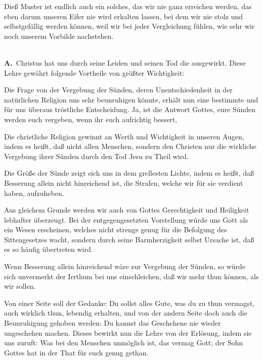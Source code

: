 \begin{aufza}
\begin{aufzb}
\item Dieß Muster ist endlich auch ein solches, das wir nie ganz erreichen werden, das eben darum unseren Eifer nie wird erkalten lassen, bei dem wir nie stolz und selbstgefällig werden können, weil wir bei jeder Vergleichung fühlen, wie sehr wir noch unserem Vorbilde nachstehen.
\end{aufzb}
\item \mbox{}\\
\textbf{A.}~Christus hat uns durch seine Leiden und seinen Tod die  ausgewirkt. Diese Lehre gewährt folgende Vortheile von größter Wichtigkeit:
\begin{aufzb}
\item Die Frage von der Vergebung der Sünden, deren Unentschiedenheit in der natürlichen Religion uns sehr beunruhigen könnte, erhält nun eine bestimmte und für uns überaus tröstliche Entscheidung. Ja, ist die Antwort Gottes, eure Sünden werden euch vergeben, wenn ihr euch aufrichtig bessert, \usw\
\item Die christliche Religion gewinnt an Werth und Wichtigkeit in unseren Augen, indem es heißt, daß nicht allen Menschen, sondern den Christen nur die wirkliche Vergebung ihrer Sünden durch den Tod Jesu zu Theil wird.~
\item Die Größe der Sünde zeigt sich uns in dem grellesten Lichte, indem es heißt, daß Besserung allein nicht hinreichend ist, die Strafen, welche wir für sie verdient haben, aufzuheben.
\item Aus gleichem Grunde werden wir auch von Gottes Gerechtigkeit und Heiligkeit lebhafter überzeugt. Bei der entgegengesetzten Vorstellung würde uns Gott als ein Wesen erscheinen, welches nicht strenge genug für die Befolgung des Sittengesetzes wacht, sondern durch seine Barmherzigkeit selbst Ursache ist, daß es so häufig übertreten wird.
\item Wenn Besserung allein hinreichend wäre zur Vergebung der Sünden, so würde sich unvermerkt der Irrthum bei uns einschleichen, daß wir mehr thun können, als wir sollen.
\item Von einer Seite soll der Gedanke: Du sollst alles Gute, was du zu thun vermagst, auch wirklich thun, lebendig erhalten, und von der andern Seite doch auch die Beunruhigung gehoben werden: Du kannst das Geschehene nie wieder ungeschehen machen. Dieses bewirkt nun die Lehre von der Erlösung, indem sie uns zuruft: Was bei den Menschen unmöglich ist, das vermag Gott; der Sohn Gottes hat in der That für euch genug gethan.

\end{aufzb}
\end{aufza}
